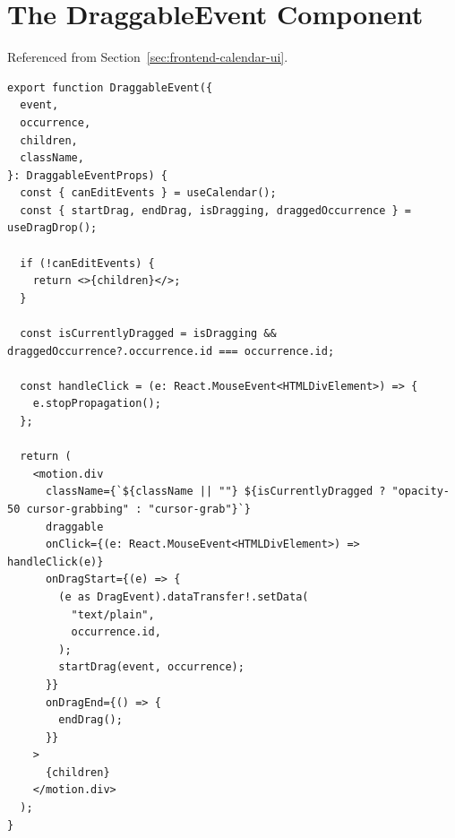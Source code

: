 \clearpage
\section{The DraggableEvent Component} \label{app:draggable-event}

Referenced from Section~\ref{sec:frontend-calendar-ui}.

\begin{lstlisting}[caption={[The DraggableEvent wrapper component, in full.]{The \texttt{DraggableEvent} wrapper component, in full (\texttt{features/calendar/dnd/draggable-event.tsx}).}}, label={lst:draggable-event-full}]
export function DraggableEvent({
  event,
  occurrence,
  children,
  className,
}: DraggableEventProps) {
  const { canEditEvents } = useCalendar();
  const { startDrag, endDrag, isDragging, draggedOccurrence } = useDragDrop();

  if (!canEditEvents) {
    return <>{children}</>;
  }

  const isCurrentlyDragged = isDragging && draggedOccurrence?.occurrence.id === occurrence.id;

  const handleClick = (e: React.MouseEvent<HTMLDivElement>) => {
    e.stopPropagation();
  };

  return (
    <motion.div
      className={`${className || ""} ${isCurrentlyDragged ? "opacity-50 cursor-grabbing" : "cursor-grab"}`}
      draggable
      onClick={(e: React.MouseEvent<HTMLDivElement>) => handleClick(e)}
      onDragStart={(e) => {
        (e as DragEvent).dataTransfer!.setData(
          "text/plain",
          occurrence.id,
        );
        startDrag(event, occurrence);
      }}
      onDragEnd={() => {
        endDrag();
      }}
    >
      {children}
    </motion.div>
  );
}
\end{lstlisting}
